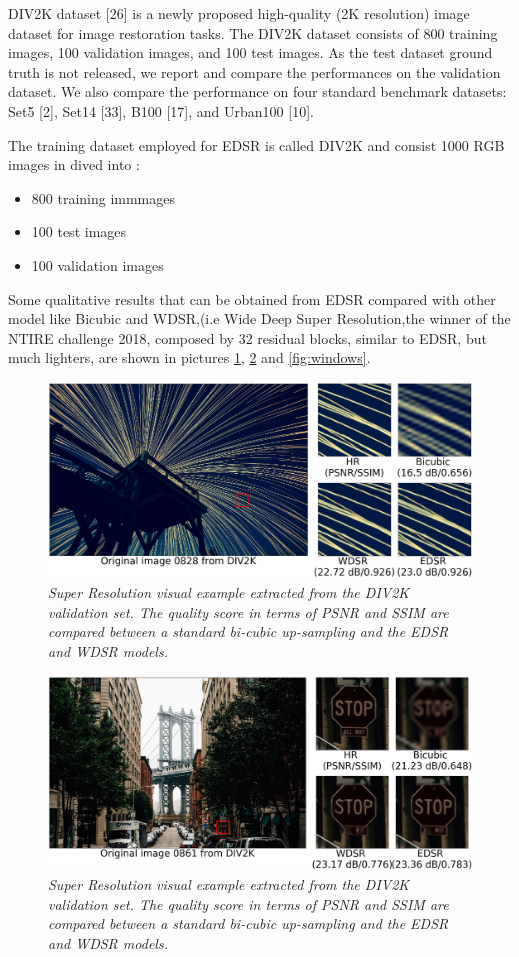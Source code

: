 \documentclass[a4paper, 10pt]{book}
\begin{document}
DIV2K dataset [26] is a newly proposed high-quality
(2K resolution) image dataset for image restoration tasks.
The DIV2K dataset consists of 800 training images, 100
validation images, and 100 test images. As the test dataset
ground truth is not released, we report and compare the performances on the validation dataset. We also compare the
performance on four standard benchmark datasets: Set5 [2],
Set14 [33], B100 [17], and Urban100 [10].


The training dataset employed for EDSR is called DIV2K and consist 1000 RGB images in dived into :
\begin{itemize}
 \setlength\itemsep{-0.8em}
\item 800 training immmages
\item 100 test images
\item100 validation images
\end{itemize}
Some qualitative results that can be obtained from EDSR compared with other model like Bicubic and WDSR,(i.e Wide Deep Super Resolution,the winner of the NTIRE challenge 2018, composed by 32 residual blocks, similar to EDSR, but much lighters, are shown in pictures \ref{fig:sky}, \ref{fig:city} and \ref{fig:windows}.
\begin{figure}[H]
  \includegraphics[scale=0.5]{sr_res1.png}
    \caption{\it Super Resolution visual example extracted from the DIV2K validation set. The quality score in terms of PSNR and SSIM are compared between a standard bi-cubic up-sampling and the EDSR and WDSR models.}
  \label{fig:sky}
\end{figure}

\begin{figure}[H]
  \includegraphics[scale=0.5]{sr_res2.png}
    \caption{\it Super Resolution visual example extracted from the DIV2K validation set. The quality score in terms of PSNR and SSIM are compared between a standard bi-cubic up-sampling and the EDSR and WDSR models.}
  \label{fig:city}
\end{figure}
\end{document}
